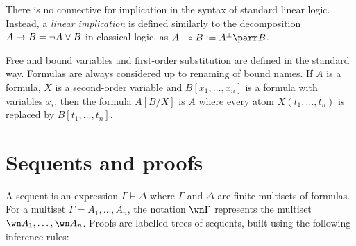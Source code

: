 There is no connective for implication in the syntax of standard linear
logic. Instead, a \emph{linear implication} is defined similarly to the
decomposition \(A\rightarrow B=\neg A\vee B\) in classical logic, as
\(A\limp B:=A\orth\parr B\).

Free and bound variables and first-order substitution are defined in the
standard way. Formulas are always considered up to renaming of bound
names. If \(A\) is a formula, \(X\) is a second-order variable and
\(B[x_1,\ldots,x_n]\) is a formula with variables \(x_i\), then the
formula \(A[B/X]\) is \(A\) where every atom \(X(t_1,\ldots,t_n)\) is
replaced by \(B[t_1,\ldots,t_n]\).

\section{Sequents and proofs}\label{sequents-and-proofs}

A sequent is an expression \(\Gamma\vdash\Delta\) where \(\Gamma\) and
\(\Delta\) are finite multisets of formulas. For a multiset
\(\Gamma=A_1,\ldots,A_n\), the notation \(\wn\Gamma\) represents the
multiset \(\wn A_1,\ldots,\wn A_n\). Proofs are labelled trees of
sequents, built using the following inference rules:

